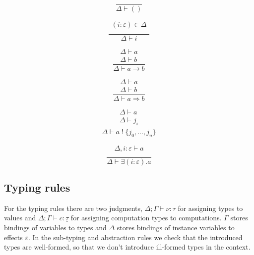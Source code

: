 \documentclass[12pt]{article}
\newcommand\eff[0]{\varepsilon}
\newcommand\ty[0]{\tau}
\newcommand\tunit[0]{()}
\newcommand\tarr[2]{#1 \rightarrow #2}
\newcommand\thandler[2]{#1 \Rightarrow #2}
\newcommand\cty[0]{\underline{\ty}}
\newcommand\aty[2]{#1 \; ! \; #2}
\newcommand\texists[3]{\exists(#1:#2) . #3}
\newcommand\val[0]{\nu}
\newcommand\comp[0]{c}
\begin{document}
\begin{minipage}{0.25\textwidth}
\[\frac{
	\begin{array}{l}
	\end{array}
}{
	\Delta \vdash \tunit
}\]
\end{minipage}
\begin{minipage}{0.25\textwidth}
\[\frac{
	\begin{array}{l}
	(i : \eff) \in \Delta \\
	\end{array}
}{
	\Delta \vdash i
}\]
\end{minipage}
\begin{minipage}{0.25\textwidth}
\[\frac{
	\begin{array}{l}
	\Delta \vdash a  \\
	\Delta \vdash b
	\end{array}
}{
	\Delta \vdash \tarr{a}{b}
}\]
\end{minipage}
\begin{minipage}{0.25\textwidth}
\[\frac{
	\begin{array}{l}
	\Delta \vdash a  \\
	\Delta \vdash b
	\end{array}
}{
	\Delta \vdash \thandler{a}{b}
}\]
\end{minipage}
\begin{minipage}{0.5\textwidth}
\[\frac{
	\begin{array}{l}
	\Delta \vdash a  \\
	\Delta \vdash j_i
	\end{array}
}{
	\Delta \vdash \aty{a}{\{ j_0, ..., j_n \}}
}\]
\end{minipage}
\begin{minipage}{0.5\textwidth}
\[\frac{
	\begin{array}{l}
	\Delta , i : \eff \vdash a  \\
	\end{array}
}{
	\Delta \vdash \texists{i}{\eff}{a}
}\]
\end{minipage}

\newpage
\subsection{Typing rules}
For the typing rules there are two judgments,
$\Delta;\Gamma \vdash \val : \ty$ for assigning types to values and $\Delta;\Gamma \vdash \comp : \cty$ for assigning computation types to computations. $\Gamma$ stores bindings of variables to types and $\Delta$ stores bindings of instance variables to effects $\eff$.
In the sub-typing and abstraction rules we check that the introduced types are well-formed, so that we don't introduce ill-formed types in the context.
\end{document}
